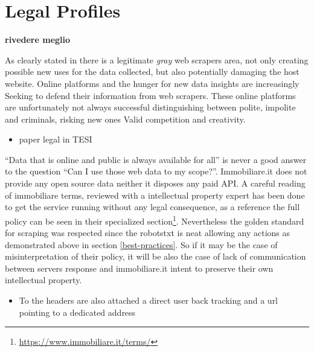 \documentclass[
  12pt,
  a4paper,
  oneside]{book}
\DeclareRobustCommand{\href}[2]{#2\footnote{\url{#1}}}
\providecommand{\tightlist}{%
  \setlength{\itemsep}{0pt}\setlength{\parskip}{0pt}}
\theoremstyle{definition}
\theoremstyle{definition}
\theoremstyle{definition}
\theoremstyle{remark}
\begin{document}
\hypertarget{legal-profiles}{%
\section{Legal Profiles}\label{legal-profiles}}

\textbf{rivedere meglio}

As clearly stated in \citet{zamora2019making} there is a legitimate \emph{gray} web scrapers area, not only creating possible new uses for the data collected, but also potentially damaging the host website. Online platforms and the hunger for new data insights are increasingly Seeking to defend their information from web scrapers. These online platforms are unfortunately not always successful distinguishing between polite, impolite and criminals, risking new ones Valid competition and creativity.

\begin{itemize}
\tightlist
\item
  paper legal in TESI
\end{itemize}

``Data that is online and public is always available for all'' is never a good answer to the question ``Can I use those web data to my scope?''. Immobiliare.it does not provide any open source data neither it disposes any paid API.
A careful reading of immobiliare terms, reviewed with a intellectual property expert has been done to get the service running without any legal consequence, as a reference the full policy can be seen in their \href{https://www.immobiliare.it/terms/}{specialized section}. Nevertheless the golden standard for scraping was respected since the robotstxt is neat allowing any actions as demonstrated above in section \ref{best-practices}. So if it may be the case of misinterpretation of their policy, it will be also the case of lack of communication between servers response and immobiliare.it intent to preserve their own intellectual property.

\begin{itemize}
\tightlist
\item
  To the headers are also attached a direct user back tracking and a url pointing to a dedicated address
\end{itemize}
\end{document}
